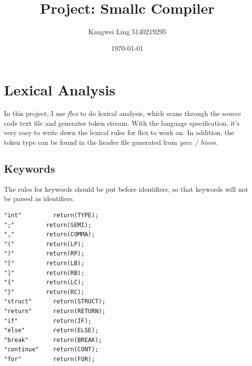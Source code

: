 \documentclass[11pt]{article}
\author{Kangwei Ling 5140219295}
\date{\today}
\title{Project: Smallc Compiler}
\begin{document}
\maketitle
\tableofcontents


\section{Lexical Analysis}
\label{sec:orgheadline5}
In this project, I use \emph{flex} to do lexical analysis, which scans through the
source code text file and generates token stream.
With the language specification, it's very easy to write down the lexical rules
for flex to work on. In addition, the token type can be found in the header file
generated from \emph{yacc / bison}.
\subsection{Keywords}
\label{sec:orgheadline1}
The rules for keywords should be put before identifiers, so that keywords will
not be parsed as identifiers.
\begin{verbatim}
"int"         return(TYPE);
";"         return(SEMI);
","         return(COMMA);
"("         return(LP);
")"         return(RP);
"["         return(LB);
"]"         return(RB);
"{"         return(LC);
"}"         return(RC);
"struct"      return(STRUCT);
"return"      return(RETURN);
"if"          return(IF);
"else"        return(ELSE);
"break"       return(BREAK);
"continue"    return(CONT);
"for"         return(FOR);
\end{verbatim}
\end{document}
